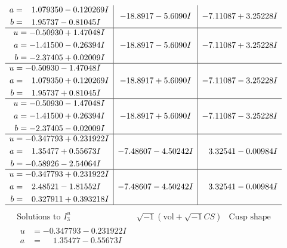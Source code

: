 \documentclass[1p]{elsarticle_modified}
\theoremstyle{definition}
\newcommand{\I}{\sqrt{-1}}
\begin{document}
$$\begin{array}{c|c|c}
\begin{aligned}
a &= \phantom{-}1.079350 - 0.120269 I \\
b &= \phantom{-}1.95737 - 0.81045 I\end{aligned}
 & -18.8917 - 5.6090 I & -7.11087 + 3.25228 I \\ \hline\begin{aligned}
u &= -0.50930 + 1.47048 I \\
a &= -1.41500 - 0.26394 I \\
b &= -2.37405 + 0.02009 I\end{aligned}
 & -18.8917 - 5.6090 I & -7.11087 + 3.25228 I \\ \hline\begin{aligned}
u &= -0.50930 - 1.47048 I \\
a &= \phantom{-}1.079350 + 0.120269 I \\
b &= \phantom{-}1.95737 + 0.81045 I\end{aligned}
 & -18.8917 + 5.6090 I & -7.11087 - 3.25228 I \\ \hline\begin{aligned}
u &= -0.50930 - 1.47048 I \\
a &= -1.41500 + 0.26394 I \\
b &= -2.37405 - 0.02009 I\end{aligned}
 & -18.8917 + 5.6090 I & -7.11087 - 3.25228 I \\ \hline\begin{aligned}
u &= -0.347793 + 0.231922 I \\
a &= \phantom{-}1.35477 + 0.55673 I \\
b &= -0.58926 - 2.54064 I\end{aligned}
 & -7.48607 - 4.50242 I & \phantom{-}3.32541 - 0.00984 I \\ \hline\begin{aligned}
u &= -0.347793 + 0.231922 I \\
a &= \phantom{-}2.48521 - 1.81552 I \\
b &= \phantom{-}0.327911 + 0.393218 I\end{aligned}
 & -7.48607 - 4.50242 I & \phantom{-}3.32541 - 0.00984 I\\
 \hline 
 \end{array}$$\newpage$$\begin{array}{c|c|c}  
\text{Solutions to }I^u_{3}& \I (\text{vol} + \sqrt{-1}CS) & \text{Cusp shape}\\
 \hline 
\begin{aligned}
u &= -0.347793 - 0.231922 I \\
a &= \phantom{-}1.35477 - 0.55673 I \\

\end{aligned}
\end{array}$$
\end{document}
